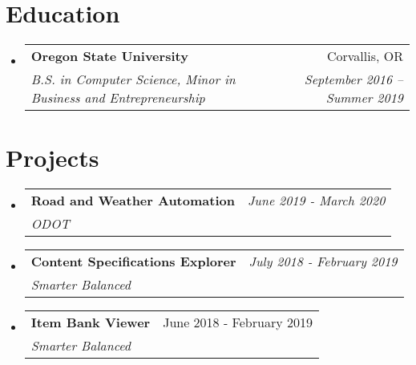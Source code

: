 \documentclass[letterpaper,11pt]{article}
\makeatletter
\newcommand{\resumeSubheading}[4]{
  \vspace{-1pt}\item
    \begin{tabular*}{0.97\textwidth}{l@{\extracolsep{\fill}}r}
      \textbf{\Large#1} & #2 \\
      \textit{\small#3} & \textit{\small #4} \\
    \end{tabular*}\vspace{-5pt}
}
\newcommand{\resumeSubHeadingListStart}{\begin{itemize}[label={},leftmargin=*]}
\newcommand{\resumeSubHeadingListEnd}{\end{itemize}}
\makeatother
\begin{document}
\section{Education}
  \resumeSubHeadingListStart
    \resumeSubheading
      {Oregon State University}{Corvallis, OR}
      {B.S. in Computer Science, Minor in Business and Entrepreneurship}{September 2016 -- Summer 2019}
  \resumeSubHeadingListEnd

\section{Projects}
  \resumeSubHeadingListStart
    \resumeSubheading
    {Road and Weather Automation}{\textit{June 2019 - March 2020}}
    {ODOT}{}
        \newline \hfill
    
    \resumeSubheading
    {Content Specifications Explorer}{\textit{July 2018 - February 2019}}{Smarter Balanced}{}
        \newline \hfill
        
    \resumeSubheading
    {Item Bank Viewer}{June 2018 - February 2019}{Smarter Balanced}{}

  \resumeSubHeadingListEnd
\end{document}
